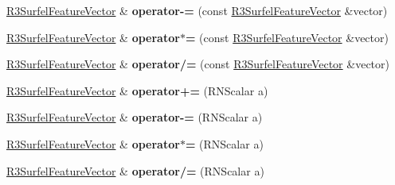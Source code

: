 \begin{DoxyCompactItemize}
\item 
\hyperlink{class_r3_surfel_feature_vector}{R3\+Surfel\+Feature\+Vector} \& {\bfseries operator-\/=} (const \hyperlink{class_r3_surfel_feature_vector}{R3\+Surfel\+Feature\+Vector} \&vector)\hypertarget{class_r3_surfel_feature_vector_a428ab09083dff2929ee2c7c24348ec61}{}\label{class_r3_surfel_feature_vector_a428ab09083dff2929ee2c7c24348ec61}

\item 
\hyperlink{class_r3_surfel_feature_vector}{R3\+Surfel\+Feature\+Vector} \& {\bfseries operator$\ast$=} (const \hyperlink{class_r3_surfel_feature_vector}{R3\+Surfel\+Feature\+Vector} \&vector)\hypertarget{class_r3_surfel_feature_vector_a37db284c6346abd4910334acf531edcb}{}\label{class_r3_surfel_feature_vector_a37db284c6346abd4910334acf531edcb}

\item 
\hyperlink{class_r3_surfel_feature_vector}{R3\+Surfel\+Feature\+Vector} \& {\bfseries operator/=} (const \hyperlink{class_r3_surfel_feature_vector}{R3\+Surfel\+Feature\+Vector} \&vector)\hypertarget{class_r3_surfel_feature_vector_a49e476402a9c45214556941ebfc46817}{}\label{class_r3_surfel_feature_vector_a49e476402a9c45214556941ebfc46817}

\item 
\hyperlink{class_r3_surfel_feature_vector}{R3\+Surfel\+Feature\+Vector} \& {\bfseries operator+=} (R\+N\+Scalar a)\hypertarget{class_r3_surfel_feature_vector_ab867c303aec9dc7904318fe49678a578}{}\label{class_r3_surfel_feature_vector_ab867c303aec9dc7904318fe49678a578}

\item 
\hyperlink{class_r3_surfel_feature_vector}{R3\+Surfel\+Feature\+Vector} \& {\bfseries operator-\/=} (R\+N\+Scalar a)\hypertarget{class_r3_surfel_feature_vector_a95dbc402175f82fc28cfb15a7411ff3a}{}\label{class_r3_surfel_feature_vector_a95dbc402175f82fc28cfb15a7411ff3a}

\item 
\hyperlink{class_r3_surfel_feature_vector}{R3\+Surfel\+Feature\+Vector} \& {\bfseries operator$\ast$=} (R\+N\+Scalar a)\hypertarget{class_r3_surfel_feature_vector_a79fddabfb4eec5f5d8a92f7388727da4}{}\label{class_r3_surfel_feature_vector_a79fddabfb4eec5f5d8a92f7388727da4}

\item 
\hyperlink{class_r3_surfel_feature_vector}{R3\+Surfel\+Feature\+Vector} \& {\bfseries operator/=} (R\+N\+Scalar a)\hypertarget{class_r3_surfel_feature_vector_a867c369eaf699c580fa7e7e604ca87d8}{}\label{class_r3_surfel_feature_vector_a867c369eaf699c580fa7e7e604ca87d8}


\end{DoxyCompactItemize}
